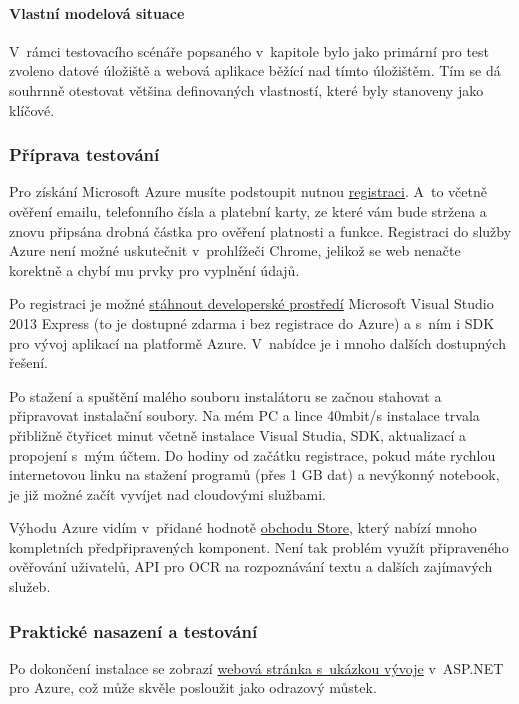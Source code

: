 \paragraph{Vlastní modelová situace}
V~rámci testovacího scénáře popsaného v~kapitole  bylo jako primární pro test zvoleno datové úložiště a webová aplikace běžící nad tímto úložištěm. Tím se dá souhrnně otestovat většina definovaných vlastností, které byly stanoveny jako klíčové.

\subsubsection{Příprava testování}
Pro získání Microsoft Azure musíte podstoupit nutnou \href{https://account.windowsazure.com}{registraci\cite{azure:web}}. A~to včetně ověření emailu, telefonního čísla a platební karty, ze které vám bude stržena a znovu připsána drobná částka pro ověření platnosti a funkce.
Registraci do služby Azure není možné uskutečnit v~prohlížeči Chrome, jelikož se web nenačte korektně a chybí mu prvky pro vyplnění údajů.

Po registraci je možné \href{http://www.windowsazure.com/en-us/downloads/}{stáhnout developerské prostředí\cite{azure:download}} Microsoft Visual Studio 2013 Express (to je dostupné zdarma i bez registrace do Azure) a s~ním i SDK pro vývoj aplikací na platformě Azure. V~nabídce je i mnoho dalších dostupných řešení.

Po stažení a spuštění malého souboru instalátoru se začnou stahovat a připravovat instalační soubory. Na mém PC a lince 40mbit/s instalace trvala přibližně čtyřicet minut včetně instalace Visual Studia, SDK, aktualizací a propojení s~mým účtem. Do hodiny od začátku registrace, pokud máte rychlou internetovou linku na stažení programů (přes 1 GB dat) a nevýkonný notebook, je již možné začít vyvíjet nad cloudovými službami.

Výhodu Azure vidím v~přidané hodnotě \href{http://www.windowsazure.com/en-us/gallery/store/}{obchodu Store\cite{azure:store}}, který nabízí mnoho kompletních předpřipravených komponent. Není tak problém využít připraveného ověřování uživatelů, API pro OCR na rozpoznávání textu a dalších zajímavých služeb.

\subsubsection{Praktické nasazení a testování}
Po dokončení instalace se zobrazí \href{http://www.windowsazure.com/en-us/documentation/articles/web-sites-dotnet-get-started/}{webová stránka s~ukázkou vývoje\cite{azure:howto}} v~ASP.NET pro Azure, což může skvěle posloužit jako odrazový můstek.

